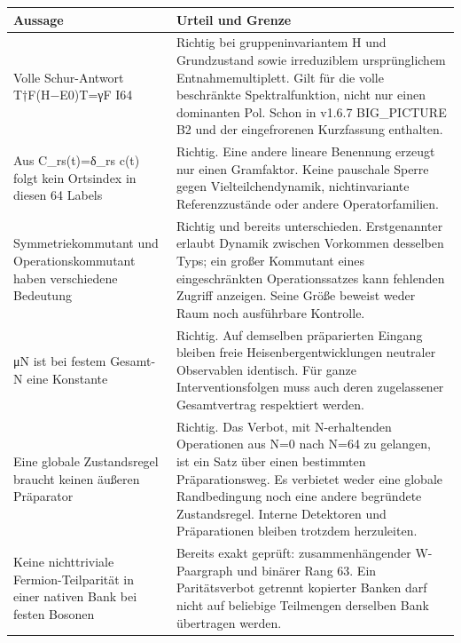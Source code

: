 {\def\LTcaptype{none} %
\begin{longtable}[]{@{}
  >{\raggedright\arraybackslash}p{}
  >{\raggedright\arraybackslash}p{}@{}}
\toprule\noalign{}
\begin{minipage}[b]{\linewidth}\raggedright
Aussage
\end{minipage} & \begin{minipage}[b]{\linewidth}\raggedright
Urteil und Grenze
\end{minipage} \\
\midrule\noalign{}
\endhead
\bottomrule\noalign{}
\endlastfoot
Volle Schur-Antwort T†F(H−E0)T=γF I64 & Richtig bei gruppeninvariantem H
und Grundzustand sowie irreduziblem ursprünglichem Entnahmemultiplett.
Gilt für die volle beschränkte Spektralfunktion, nicht nur einen
dominanten Pol. Schon in v1.6.7 BIG\_PICTURE B2 und der eingefrorenen
Kurzfassung enthalten. \\
Aus C\_rs(t)=δ\_rs c(t) folgt kein Ortsindex in diesen 64 Labels &
Richtig. Eine andere lineare Benennung erzeugt nur einen Gramfaktor.
Keine pauschale Sperre gegen Vielteilchendynamik, nichtinvariante
Referenzzustände oder andere Operatorfamilien. \\
Symmetriekommutant und Operationskommutant haben verschiedene Bedeutung
& Richtig und bereits unterschieden. Erstgenannter erlaubt Dynamik
zwischen Vorkommen desselben Typs; ein großer Kommutant eines
eingeschränkten Operationssatzes kann fehlenden Zugriff anzeigen. Seine
Größe beweist weder Raum noch ausführbare Kontrolle. \\
μN ist bei festem Gesamt-N eine Konstante & Richtig. Auf demselben
präparierten Eingang bleiben freie Heisenbergentwicklungen neutraler
Observablen identisch. Für ganze Interventionsfolgen muss auch deren
zugelassener Gesamtvertrag respektiert werden. \\
Eine globale Zustandsregel braucht keinen äußeren Präparator & Richtig.
Das Verbot, mit N-erhaltenden Operationen aus N=0 nach N=64 zu gelangen,
ist ein Satz über einen bestimmten Präparationsweg. Es verbietet weder
eine globale Randbedingung noch eine andere begründete Zustandsregel.
Interne Detektoren und Präparationen bleiben trotzdem herzuleiten. \\
Keine nichttriviale Fermion-Teilparität in einer nativen Bank bei festen
Bosonen & Bereits exakt geprüft: zusammenhängender W-Paargraph und
binärer Rang 63. Ein Paritätsverbot getrennt kopierter Banken darf nicht
auf beliebige Teilmengen derselben Bank übertragen werden. \\
\end{longtable}
}

